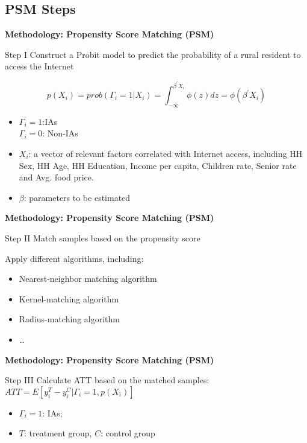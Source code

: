 \documentclass{beamer}	%
\theoremstyle{plain}
\theoremstyle{definition}
\theoremstyle{remark}
\numberwithin{equation}{section}
\begin{document}
\subsection {PSM Steps}
\begin{frame}
	\textbf{Methodology: Propensity Score Matching (PSM)} \\
	\linespread{1.2}
	\begin{block}{Step I}
		Construct a Probit model to predict the probability of a rural resident to access the Internet
	\end{block}
		\[p(X_i)=prob(\Gamma_i=1|X_i)=\int_{-\infty}^{\beta^{'}X_i}\phi(z)dz=\phi(\beta^{'}X_i)\]
	\begin{itemize}
		\item \(\Gamma_i=1\):IAs\\
		\(\Gamma_i=0\): Non-IAs
		\item \(X_i\): a vector of relevant factors correlated with Internet access, including HH Sex, HH Age, HH Education, Income per capita, Children rate, Senior rate and Avg. food price.
		\item \(\beta\): parameters to be estimated
	\end{itemize}
\end{frame}

\begin{frame}
	\textbf{Methodology: Propensity Score Matching (PSM)} \\
	\linespread{1.2}
	\begin{block}{Step II}
		Match samples based on the propensity score
	\end{block}
		Apply different algorithms, including:\\
	\begin{itemize}
		\item Nearest-neighbor matching algorithm
		\item Kernel-matching algorithm
		\item Radius-matching algorithm
		\item \dots
	\end{itemize}
\end{frame}

\begin{frame}
	\textbf{Methodology: Propensity Score Matching (PSM)} \\
	\linespread{1.2}
	\begin{block}{Step III}
		Calculate ATT based on the matched samples: \\
		$ATT=E[y_i^T-y_i^C|\Gamma_{i}=1,p(X_i)]$
	\end{block}
	\begin{itemize}
		\item \(\Gamma_i=1\): IAs;
		\item \(T\): treatment group, \(C\): control group
	\end{itemize}
\end{frame}
\end{document}
